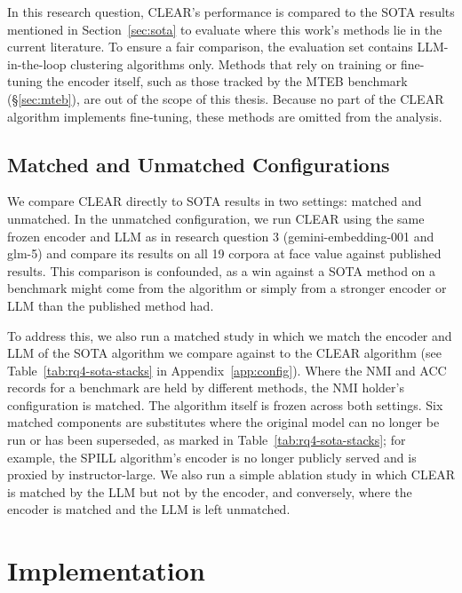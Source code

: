 \documentclass[11pt,a4paper,oneside]{report}
\begin{document}
In this research question, CLEAR's performance is compared to the SOTA results mentioned in Section~\ref{sec:sota} to evaluate where this work's methods lie in the current literature. To ensure a fair comparison, the evaluation set contains LLM-in-the-loop clustering algorithms only. Methods that rely on training or fine-tuning the encoder itself, such as those tracked by the MTEB benchmark (\S\ref{sec:mteb}), are out of the scope of this thesis. Because no part of the CLEAR algorithm implements fine-tuning, these methods are omitted from the analysis.

\subsection{Matched and Unmatched Configurations}\label{sec:matchedconfigs}

We compare CLEAR directly to SOTA results in two settings: matched and unmatched. In the unmatched configuration, we run CLEAR using the same frozen encoder and LLM as in research question 3 ({\small\ttfamily gemini-embedding-001} and {\small\ttfamily glm-5}) and compare its results on all 19 corpora at face value against published results. This comparison is confounded, as a win against a SOTA method on a benchmark might come from the algorithm or simply from a stronger encoder or LLM than the published method had.

To address this, we also run a matched study in which we match the encoder and LLM of the SOTA algorithm we compare against to the CLEAR algorithm (see Table~\ref{tab:rq4-sota-stacks} in Appendix~\ref{app:config}). Where the NMI and ACC records for a benchmark are held by different methods, the NMI holder's configuration is matched. The algorithm itself is frozen across both settings. Six matched components are substitutes where the original model can no longer be run or has been superseded, as marked in Table~\ref{tab:rq4-sota-stacks}; for example, the SPILL algorithm's encoder is no longer publicly served and is proxied by {\small\ttfamily instructor-large}. We also run a simple ablation study in which CLEAR is matched by the LLM but not by the encoder, and conversely, where the encoder is matched and the LLM is left unmatched.





\section{Implementation}\label{sec:implementation}
\end{document}
